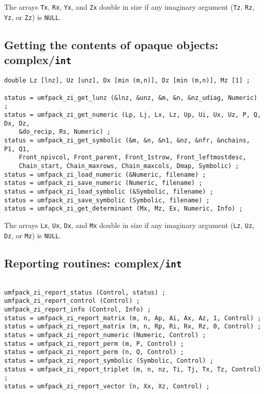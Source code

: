 \documentclass[11pt]{article}
\begin{document}
The arrays {\tt Tx}, {\tt Rx}, {\tt Yx}, and {\tt Zx} double in size if
any imaginary argument ({\tt Tz}, {\tt Rz}, {\tt Yz}, or {\tt Zz}) is {\tt NULL}.

\subsection{Getting the contents of opaque objects: complex/{\tt int}}

{\footnotesize
\begin{verbatim}
double Lz [lnz], Uz [unz], Dx [min (m,n)], Dz [min (m,n)], Mz [1] ;

status = umfpack_zi_get_lunz (&lnz, &unz, &m, &n, &nz_udiag, Numeric) ;
status = umfpack_zi_get_numeric (Lp, Lj, Lx, Lz, Up, Ui, Ux, Uz, P, Q, Dx, Dz,
    &do_recip, Rs, Numeric) ;
status = umfpack_zi_get_symbolic (&m, &n, &n1, &nz, &nfr, &nchains, P1, Q1,
    Front_npivcol, Front_parent, Front_1strow, Front_leftmostdesc,
    Chain_start, Chain_maxrows, Chain_maxcols, Dmap, Symbolic) ;
status = umfpack_zi_load_numeric (&Numeric, filename) ;
status = umfpack_zi_save_numeric (Numeric, filename) ;
status = umfpack_zi_load_symbolic (&Symbolic, filename) ;
status = umfpack_zi_save_symbolic (Symbolic, filename) ;
status = umfapck_zi_get_determinant (Mx, Mz, Ex, Numeric, Info) ;
\end{verbatim}
}

The arrays {\tt Lx}, {\tt Ux}, {\tt Dx}, and {\tt Mx} double in size if
any imaginary argument ({\tt Lz}, {\tt Uz}, {\tt Dz}, or {\tt Mz}) is {\tt NULL}.

\subsection{Reporting routines: complex/{\tt int}}

{\footnotesize
\begin{verbatim}

umfpack_zi_report_status (Control, status) ;
umfpack_zi_report_control (Control) ;
umfpack_zi_report_info (Control, Info) ;
status = umfpack_zi_report_matrix (m, n, Ap, Ai, Ax, Az, 1, Control) ;
status = umfpack_zi_report_matrix (m, n, Rp, Ri, Rx, Rz, 0, Control) ;
status = umfpack_zi_report_numeric (Numeric, Control) ;
status = umfpack_zi_report_perm (m, P, Control) ;
status = umfpack_zi_report_perm (n, Q, Control) ;
status = umfpack_zi_report_symbolic (Symbolic, Control) ;
status = umfpack_zi_report_triplet (m, n, nz, Ti, Tj, Tx, Tz, Control) ;
status = umfpack_zi_report_vector (n, Xx, Xz, Control) ;
\end{verbatim}
}
\end{document}
